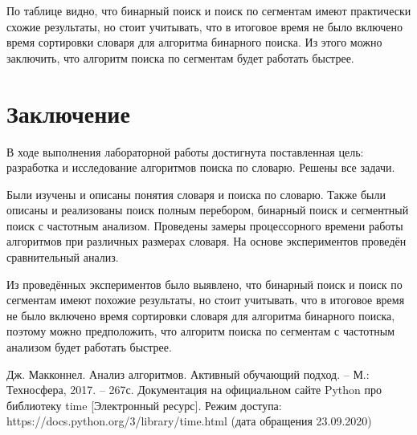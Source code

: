 \documentclass[12pt,a4paper]{report}
\begin{document}
По таблице видно, что бинарный поиск и поиск по сегментам имеют практически схожие результаты, но стоит 
учитывать, что в итоговое время не было включено время сортировки словаря для алгоритма бинарного поиска.
Из этого можно заключить, что алгоритм поиска по сегментам будет работать быстрее.

\newpage
\chapter*{Заключение}

В ходе выполнения лабораторной работы достигнута поставленная цель: разработка и исследование алгоритмов 
поиска по словарю. Решены все задачи.

Были изучены и описаны понятия словаря и поиска по словарю. 
Также были описаны и реализованы поиск полным перебором, бинарный поиск и сегментный поиск с частотным 
анализом.
Проведены замеры процессорного времени работы алгоритмов при различных размерах словаря. 
На основе экспериментов проведён сравнительный анализ.

Из проведённых экспериментов было выявлено, что бинарный поиск и поиск по сегментам имеют похожие 
результаты, но стоит учитывать, что в итоговое время не было включено время сортировки словаря для 
алгоритма бинарного поиска, поэтому можно предположить, что алгоритм поиска по сегментам с частотным 
анализом будет работать быстрее.

\newpage
\renewcommand\bibname{Список литературы}
\makeatletter %
\def\@biblabel#1{#1. }
\makeatother
\begin{thebibliography}{2}
     Дж. Макконнел. Анализ алгоритмов. Активный обучающий подход. -- М.: Техносфера, 2017. -- 267с.
     Документация на официальном сайте Python про библиотеку time [Электронный ресурс]. Режим доступа: https://docs.python.org/3/library/time.html (дата обращения 23.09.2020)
\end{thebibliography}
\end{document}
